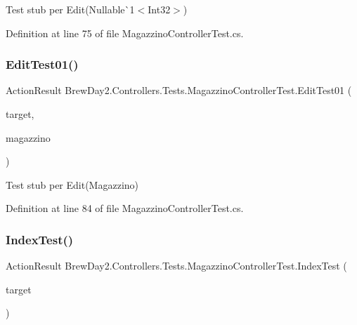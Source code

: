 Test stub per Edit(Nullable\`{}1$<$Int32$>$)



Definition at line 75 of file Magazzino\+Controller\+Test.\+cs.

\mbox{\label{class_brew_day2_1_1_controllers_1_1_tests_1_1_magazzino_controller_test_a6592cd6f5e4c66e566c8af09b57749e1}} 
\subsubsection{\texorpdfstring{Edit\+Test01()}{EditTest01()}}
{\footnotesize\ttfamily Action\+Result Brew\+Day2.\+Controllers.\+Tests.\+Magazzino\+Controller\+Test.\+Edit\+Test01 (\begin{DoxyParamCaption}\item[{\mbox{[}\+Pex\+Assume\+Under\+Test\mbox{]} \mbox{\hyperlink{class_brew_day2_1_1_controllers_1_1_magazzino_controller}{Magazzino\+Controller}}}]{target,  }\item[{\mbox{\hyperlink{class_brew_day2_1_1_models_1_1_magazzino}{Magazzino}}}]{magazzino }\end{DoxyParamCaption})}



Test stub per Edit(\+Magazzino)



Definition at line 84 of file Magazzino\+Controller\+Test.\+cs.

\mbox{\label{class_brew_day2_1_1_controllers_1_1_tests_1_1_magazzino_controller_test_af21c41170e1ae72afc6c649e2a31dda9}} 
\subsubsection{\texorpdfstring{Index\+Test()}{IndexTest()}}
{\footnotesize\ttfamily Action\+Result Brew\+Day2.\+Controllers.\+Tests.\+Magazzino\+Controller\+Test.\+Index\+Test (\begin{DoxyParamCaption}\item[{\mbox{[}\+Pex\+Assume\+Under\+Test\mbox{]} \mbox{\hyperlink{class_brew_day2_1_1_controllers_1_1_magazzino_controller}{Magazzino\+Controller}}}]{target }\end{DoxyParamCaption})}



